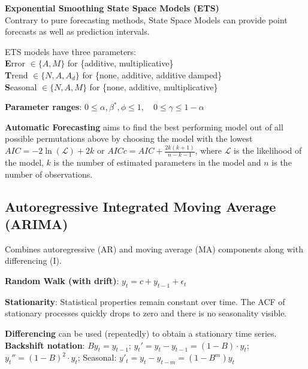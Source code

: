 \begin{minipage}[t]{0.49\textwidth}
\textbf{Exponential Smoothing State Space Models (ETS)}\\
Contrary to pure forecasting methods, State Space Models can provide point forecasts as well as prediction intervals.

ETS models have three parameters:\\
\textbf{E}rror \(\in \{A, M\}\) for \{additive, multiplicative\}\\
\textbf{T}rend \(\in \{N, A, A_d\}\) for \{none, additive, additive damped\}\\
\textbf{S}easonal \(\in \{N, A, M\}\) for \{none, additive, multiplicative\}
\end{minipage}
\hfill
\begin{minipage}[t]{0.49\textwidth}
\textbf{Parameter ranges}:
\(0 \le \alpha, \beta^*, \phi \le 1, \quad 0 \le \gamma \le  1-\alpha\)

\vspace{2mm}
\textbf{Automatic Forecasting} aims to find the best performing model out of all possible permutations above by choosing
the model with the lowest $ AIC = -2 \ln(\mathcal{L}) + 2k $ or $ AICc = AIC + \frac{2k(k+1)}{n-k-1} $,
where $ \mathcal{L} $ is the likelihood of the model, $ k $ is the number of estimated parameters in the model and $ n $ is the number of observations.
\end{minipage}


\subsection{Autoregressive Integrated Moving Average (ARIMA)}
Combines autoregressive (AR) and moving average (MA) components along with differencing (I).

\begin{minipage}[t]{0.49\textwidth}
\textbf{Random Walk (with drift)}: $ y_t = c + y_{t-1} + \epsilon_t $

\textbf{Stationarity}: Statistical properties remain constant over time.
The ACF of stationary processes quickly drops to zero and there is no seasonality visible.
\end{minipage}
\hfill
\begin{minipage}[t]{0.49\textwidth}
\textbf{Differencing} can be used (repeatedly) to obtain a stationary time series.\\
\textbf{Backshift notation}: $ By_t = y_{t-1}$; $y_t' = y_t - y_{t-1} = (1 - B) \cdot y_t$; $y_t'' = (1 - B)^2 \cdot y_t$;
Seasonal: $y'_t = y_t - y_{t-m} = (1-B^m)y_t $
\end{minipage}

